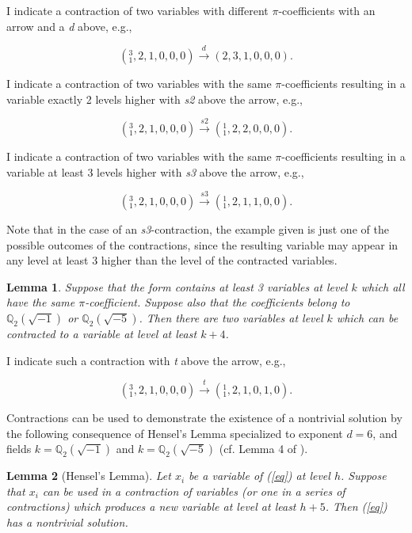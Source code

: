 \documentclass{article}
\newtheorem{lemma}{Lemma}
\begin{document}
I indicate a contraction of two variables with different $\pi$-coefficients with an arrow and a \textit{d} above, e.g.,

$$(^3_1, 2, 1, 0, 0, 0) \xrightarrow{d} (2, 3, 1, 0, 0, 0).$$

I indicate a contraction of two variables with the same $\pi$-coefficients resulting in a variable exactly 2 levels higher with \textit{s2} above the arrow, e.g.,

$$(^3_1, 2, 1, 0, 0, 0) \xrightarrow{s2} (^1_1, 2, 2, 0, 0, 0).$$

I indicate a contraction of two variables with the same $\pi$-coefficients resulting in a variable at least 3 levels higher with \textit{s3} above the arrow, e.g.,

$$(^3_1, 2, 1, 0, 0, 0) \xrightarrow{s3} (^1_1, 2, 1, 1, 0, 0).$$

Note that in the case of an \textit{s3}-contraction, the example given is just one of the possible outcomes of the contractions, since the resulting variable may appear in any level at least 3 higher than the level of the contracted variables.

\begin{lemma}
\label{three}
Suppose that the form contains at least 3 variables at level $k$ which all have the same $\pi$-coefficient.  Suppose also that the coefficients belong to $\mathbb{Q}_2(\sqrt{-1})$ or $\mathbb{Q}_2(\sqrt{-5})$.  Then there are two variables at level $k$ which can be contracted to a variable at level at least $k + 4$.
\end{lemma}

I indicate such a contraction with \textit{t} above the arrow, e.g.,

$$(^3_1, 2, 1, 0, 0, 0) \xrightarrow{t} (^1_1, 2, 1, 0, 1, 0).$$

Contractions can be used to demonstrate the existence of a nontrivial solution by the following consequence of Hensel's Lemma specialized to exponent $d=6$, and fields $k=\mathbb{Q}_2(\sqrt{-1})$ and $k=\mathbb{Q}_2(\sqrt{-5})$ (cf. Lemma 4 of \cite{knapp2016solubility}).

\begin{lemma}[Hensel's Lemma]
Let $x_i$ be a variable of (\ref{eq}) at level $h$.  Suppose that $x_i$ can be used in a contraction of variables (or one in a series of contractions) which produces a new variable at level at least $h+5$.  Then (\ref{eq}) has a nontrivial solution.
\end{lemma}
\end{document}
